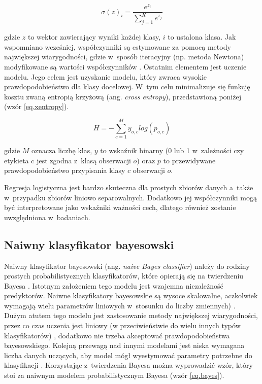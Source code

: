 \begin{equation}
\label{eq.softmax}
\sigma(z)_i=\frac {e^{z_i}} { 
    \sum \limits_{j=1}^{K} e^{z_j}}
\end{equation}

\noindent gdzie $z$ to wektor zawierający wyniki każdej klasy, $i$ to ustalona klasa. Jak wspomniano wcześniej, współczynniki są estymowane za pomocą metody największej wiarygodności, gdzie w~sposób iteracyjny (np. metoda Newtona) modyfikowane są wartości współczynników \cite{Menard02}. Ostatnim elementem jest uczenie modelu. Jego celem jest uzyskanie modelu, który zwraca wysokie prawdopodobieństwo dla klasy docelowej. W~tym celu minimalizuje się funkcję kosztu zwaną entropią krzyżową (ang. \textit{cross entropy}), przedstawioną poniżej (wzór \ref{eq.xentropy}). 

\begin{equation}
\label{eq.xentropy}
	H=-\sum \limits_{c=1}^{M}y_{o,c}log(p_{o,c})
\end{equation}

\noindent gdzie $M$ oznacza liczbę klas, $y$ to wskaźnik binarny (0 lub 1 w~zależności czy etykieta c jest zgodna z~klasą obserwacji $o$) oraz $p$ to przewidywane prawdopodobieństwo przypisania klasy $c$ obserwacji $o$.

Regresja logistyczna jest bardzo skuteczna dla prostych zbiorów danych a~także w~przypadku zbiorów liniowo separowalnych. Dodatkowo jej współczynniki mogą być interpretowane jako wskaźniki ważności cech, dlatego również zostanie uwzględniona w~badaniach.



\subsection{Naiwny klasyfikator bayesowski}
\label{cha:Naiwny klasyfikator bayesowski}

Naiwny klasyfikator bayesowski (ang. \textit{naive Bayes classifier}) należy do rodziny prostych probabilistycznych klasyfikatorów, które opierają się na twierdzeniu Bayesa \cite{wiki:bayes}. Istotnym założeniem tego modelu jest wzajemna niezależność predyktorów. Naiwne klasyfikatory bayesowskie są wysoce skalowalne, aczkolwiek wymagają wielu parametrów liniowych w~stosunku do liczby zmiennych) \cite{wiki:bayes}. Dużym atutem tego modelu jest zastosowanie metody największej wiarygodności, przez co czas uczenia jest liniowy (w przeciwieństwie do wielu innych typów klasyfikatorów) \cite{wiki:bayes}, dodatkowo nie trzeba akceptować prawdopodobieństwa bayesowskiego. Kolejną przewagą nad innymi modelami jest niska wymagana liczba danych uczących, aby model mógł wyestymować parametry potrzebne do klasyfikacji \cite{wiki:bayes}. Korzystając z~twierdzenia Bayesa można wyprowadzić wzór, który stoi za naiwnym modelem probabilistycznym Bayesa (wzór \ref{eq.bayes}).

